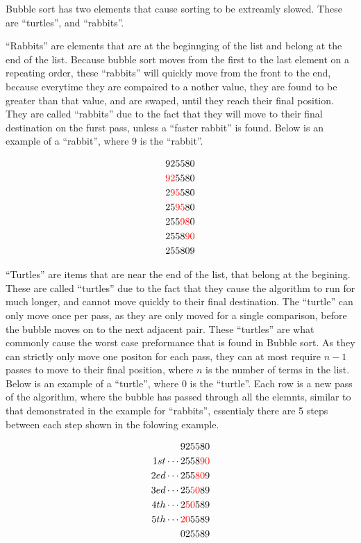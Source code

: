 \documentclass{subfile}
\begin{document}
\begin{multicols}{2}
     Bubble sort has two elements that cause sorting to be extreamly slowed.
     These are ``turtles'', and ``rabbits''.
     
     ``Rabbits'' are elements that are at the beginnging of the list and belong
     at the end of the list. Because bubble sort moves from the first to the
     last element on a repeating order, these ``rabbits'' will quickly move
     from the front to the end, because everytime they are compaired to a
     nother value, they are found to be greater than that value, and are
     swaped, until they reach their final position. They are called
     ``rabbits'' due to the fact that they will move to their final destination
     on the furst pass, unless a ``faster rabbit'' is found. Below is an
     example of a ``rabbit'', where $9$ is the ``rabbit''.

     \begin{align*}
       925580\\
       \textcolor{red}{92}5580\\
       2\textcolor{red}{95}580\\
       25\textcolor{red}{95}80\\
       255\textcolor{red}{98}0\\
       2558\textcolor{red}{90}\\
       255809\\
     \end{align*}
     
     ``Turtles'' are items that are near the end of the list, that belong at
     the begining. These are called ``turtles'' due to the fact that they cause
     the algorithm to run for much longer, and cannot move quickly to their
     final destination. The ``turtle'' can only move once per pass, as they are
     only moved for a single comparison, before the bubble moves on to the next
     adjacent pair. These ``turtles'' are what commonly cause the worst case
     preformance that is found in Bubble sort. As they can strictly only move
     one positon for each pass, they can at most require $n-1$ passes to move
     to their final position, where $n$ is the number of terms in the list.
     Below is an example of a ``turtle'', where $0$ is the ``turtle''. Each row
     is a new pass of the algorithm, where the bubble has passed through all
     the elemnts, similar to that demonstrated in the example for ``rabbits'',
     essentialy there are 5 steps between each step shown in the folowing
     example. 

     \begin{align*}
       925580\\
       1st \cdots 2558\textcolor{red}{90}\\
       2ed \cdots 255\textcolor{red}{80}9\\
       3ed \cdots 25\textcolor{red}{50}89\\
       4th \cdots 2\textcolor{red}{50}589\\
       5th \cdots \textcolor{red}{20}5589\\
       025589\\
     \end{align*}


\end{multicols}
\end{document}
